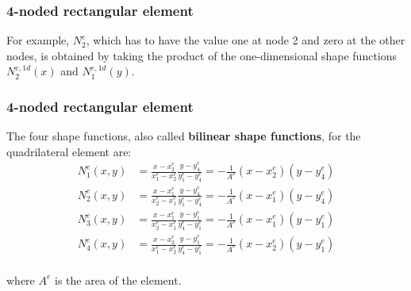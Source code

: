 \documentclass[notes]{beamer}
\begin{document}
\begin{frame}
\frametitle{4-noded rectangular element}
For example, $N_2^e$, which has to have the value one at node 2 and zero at the other nodes,
is obtained by taking the product of the one-dimensional shape functions $N_2^{e,1d}(x)$ and 
$N_1^{e,1d}(y)$.

\end{frame}


\begin{frame}
\frametitle{4-noded rectangular element}

The four shape functions, also called \textbf{bilinear shape functions}, for the quadrilateral element are:
\begin{align*}
	N_1^e (x, y) & = \frac{x - x_2^e}{x_1^e - x_2^e}\frac{y - y_4^e}{y_1^e - y_4^e} = -\frac{1}{A^e}(x - x_2^e)(y - y_4^e) \\
	N_2^e (x, y) & = \frac{x - x_1^e}{x_2^e - x_1^e}\frac{y - y_4^e}{y_1^e - y_4^e} = -\frac{1}{A^e}(x - x_1^e)(y - y_4^e) \\
	N_3^e (x, y) & = \frac{x - x_1^e}{x_2^e - x_1^e}\frac{y - y_1^e}{y_4^e - y_1^e} = -\frac{1}{A^e}(x - x_1^e)(y - y_1^e) \\
	N_4^e (x, y) & = \frac{x - x_2^e}{x_1^e - x_2^e}\frac{y - y_1^e}{y_4^e - y_1^e} = -\frac{1}{A^e}(x - x_2^e)(y - y_1^e)\\
\end{align*}

where $A^e$ is the area of the element.

\end{frame}
\end{document}
